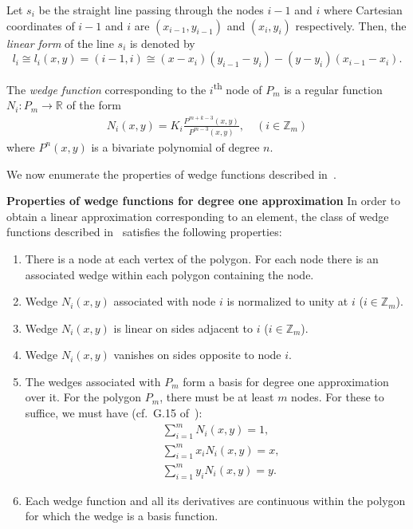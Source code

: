 \documentclass[automatic-bibliography, defaultmaths=false]{univsci}
\begin{document}
\begin{definition}
  Let $s_{i}$ be the straight line passing through the nodes $i-1$ and $i$
  where Cartesian coordinates of $i-1$ and $i$ are $(x_{i-1},y_{i-1})$ and
  $(x_i,y_i)$ respectively. Then, the \emph{linear form} of the line $s_i$ is
  denoted by
  \begin{equation}\label{r1}
    l_i\cong l_i(x,y)=(i-1,i)\cong (x-x_i)(y_{i-1}-y_i)-(y-y_i)(x_{i-1}-x_i).
  \end{equation}
\end{definition}

\begin{definition}
  The \emph{wedge function} corresponding to the $i$\textsuperscript{th} node of
  $P_m$ is a regular function $N_i: P_m \rightarrow \mathbb{R}$ of the form
  \begin{eqnarray}
    N_i(x,y)= K_i\frac{P^{m+k-3}(x,y)}{P^{m-3}(x,y)},\quad (i\in\mathbb{Z}_m)\label{eq1}
  \end{eqnarray}
  where $P^n(x,y)$ is a bivariate polynomial of degree $n$.
\end{definition}

We now enumerate the properties of wedge functions described in~\cite{wachs}.

\textbf{Properties of wedge functions for degree one approximation}\:\cite{wachs}
In order to obtain a linear approximation corresponding to an element, the class
of wedge functions described in~\cite{wachs} satisfies the following properties:
\begin{enumerate}
  \item There is a node at each vertex of the polygon. For each node there is an
        associated wedge within each polygon containing the node.
  \item Wedge $N_i(x,y)$ associated with node $i$ is normalized to unity at $i$
        ($i\in\mathbb{Z}_m$).
  \item Wedge $N_i(x,y)$ is linear on sides adjacent to $i$
        ($i\in\mathbb{Z}_m$).
  \item{\label{4_2}} Wedge $N_i(x,y)$ vanishes on sides opposite to node
        $i$.
  \item{\label{5_2}} The wedges associated with $P_m$ form a basis for
        degree one approximation over it. For the polygon $P_m$, there must be at least
        $m$ nodes. For these to suffice, we must have (cf.~G.15 of~\cite{das1}):
        \begin{align}
          &\sum_{i=1}^{m}N_i(x,y) = 1, \label{2.1_1}\\
          &\sum_{i=1}^{m}x_iN_i(x,y) = x,\\
          &\sum_{i=1}^{m}y_iN_i(x,y) = y.
        \end{align}
  \item Each wedge function and all its derivatives are continuous within the polygon
        for which the wedge is a basis function.
\end{enumerate}
\end{document}
